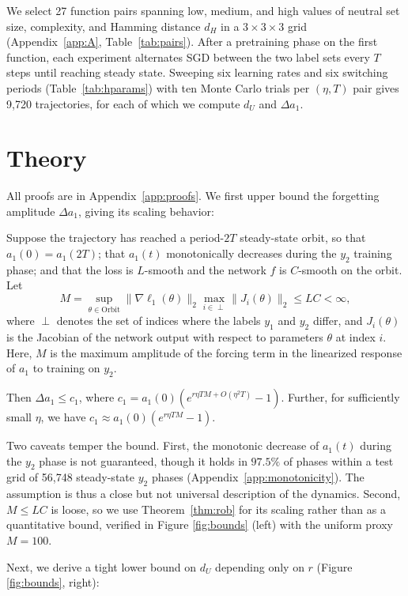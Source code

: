 \documentclass[pmlr]{jmlr} %
\begin{document}
We select 27 function pairs spanning low, medium, and high values of neutral set size, complexity, and Hamming distance $d_H$ in a $3\times3\times3$ grid (Appendix~\ref{app:A}, Table~\ref{tab:pairs}). After a pretraining phase on the first function, each experiment alternates SGD between the two label sets every $T$ steps until reaching steady state. Sweeping six learning rates and six switching periods (Table~\ref{tab:hparams}) with ten Monte Carlo trials per $(\eta, T)$ pair gives 9{,}720 trajectories, for each of which we compute $d_U$ and $\Delta a_1$.

\section{Theory}

All proofs are in Appendix~\ref{app:proofs}. We first upper bound the forgetting amplitude $\Delta a_1$, giving its scaling behavior:

\begin{theorem}
\label{thm:rob}
Suppose the trajectory has reached a period-$2T$ steady-state orbit, so that $a_1(0)=a_1(2T)$; that $a_1(t)$ monotonically decreases during the $y_2$ training phase; and that the loss is $L$-smooth and the network $f$ is $C$-smooth on the orbit. Let
\[
M=\sup_{\theta \in \mathrm{Orbit}}\| \nabla \ell_{1}(\theta)\|_{2} \max_{i\in\perp} \|J_i(\theta)\|_2 \le LC < \infty,
\]
where $\perp$ denotes the set of indices where the labels $y_1$ and $y_2$ differ, and $J_i(\theta)$ is the Jacobian of the network output with respect to parameters $\theta$ at index $i$. Here, $M$ is the maximum amplitude of the forcing term in the linearized response of $a_1$ to training on $y_2$.

Then $\Delta a_1\leq c_1$, where $c_1=a_1(0)(e^{r\eta T M + O(\eta^2 T)}-1)$. Further, for sufficiently small $\eta$, we have $c_1\approx a_1(0)(e^{r\eta T M}-1)$.
\end{theorem}

Two caveats temper the bound. First, the monotonic decrease of $a_1(t)$ during the $y_2$ phase is not guaranteed, though it holds in $97.5\%$ of phases within a test grid of 56{,}748 steady-state $y_2$ phases (Appendix~\ref{app:monotonicity}). The assumption is thus a close but not universal description of the dynamics. Second, $M\le LC$ is loose, so we use Theorem~\ref{thm:rob} for its scaling rather than as a quantitative bound, verified in Figure \ref{fig:bounds} (left) with the uniform proxy $M=100$.

Next, we derive a tight lower bound on $d_U$ depending only on $r$ (Figure \ref{fig:bounds}, right):
\end{document}
